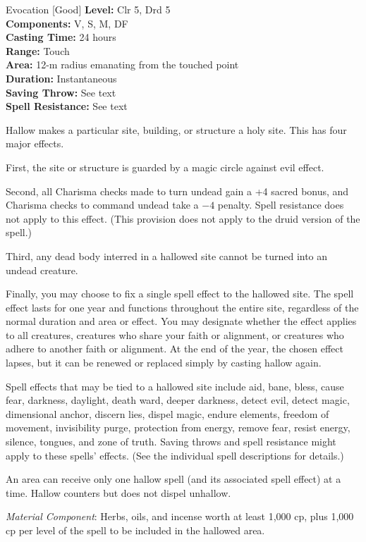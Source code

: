 {Evocation [Good]}
{
	\textbf{Level:}
	Clr 5, Drd 5\\
	\textbf{Components:}
	V, S, M, DF\\
	\textbf{Casting Time:}
	24 hours\\
	\textbf{Range:}
	Touch\\
	\textbf{Area:}
	12-m radius emanating from the touched point\\
	\textbf{Duration:}
	Instantaneous\\
	\textbf{Saving Throw:}
	See text\\
	\textbf{Spell Resistance:}
	See text\\
}
{
	Hallow makes a particular site, building, or structure a holy site. This has four major effects.

	First, the site or structure is guarded by a magic circle against evil effect.

	Second, all Charisma checks made to turn undead gain a +4 sacred bonus, and Charisma checks to command undead take a $-4$ penalty. Spell resistance does not apply to this effect. (This provision does not apply to the druid version of the spell.)

	Third, any dead body interred in a hallowed site cannot be turned into an undead creature.

	Finally, you may choose to fix a single spell effect to the hallowed site. The spell effect lasts for one year and functions throughout the entire site, regardless of the normal duration and area or effect. You may designate whether the effect applies to all creatures, creatures who share your faith or alignment, or creatures who adhere to another faith or alignment. At the end of the year, the chosen effect lapses, but it can be renewed or replaced simply by casting hallow again.

	Spell effects that may be tied to a hallowed site include aid, bane, bless, cause fear, darkness, daylight, death ward, deeper darkness, detect evil, detect magic, dimensional anchor, discern lies, dispel magic, endure elements, freedom of movement, invisibility purge, protection from energy, remove fear, resist energy, silence, tongues, and zone of truth. Saving throws and spell resistance might apply to these spells' effects. (See the individual spell descriptions for details.)

	An area can receive only one hallow spell (and its associated spell effect) at a time. Hallow counters but does not dispel unhallow.

	\textit{Material Component}:
	Herbs, oils, and incense worth at least 1,000 cp, plus 1,000 cp per level of the spell to be included in the hallowed area.

}
